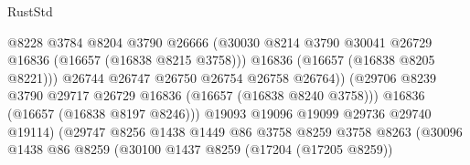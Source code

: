 \begin{lexlean}{RustStd}
\begin{coremodule}
                                              @8228
                                              @3784
                                              @8204
                                              @3790
                                              @26666
                                              (@30030
                                                @8214
                                                @3790
                                                @30041
                                                @26729
                                                @16836
                                                (@16657 (@16838 @8215 @3758)))
                                              @16836
                                              (@16657 (@16838 @8205 @8221)))
                                            @26744
                                            @26747
                                            @26750
                                            @26754
                                            @26758
                                            @26764))
                                        (@29706
                                          @8239
                                          @3790
                                          @29717
                                          @26729
                                          @16836
                                          (@16657 (@16838 @8240 @3758)))
                                        @16836
                                        (@16657 (@16838 @8197 @8246)))
                                      @19093
                                      @19096
                                      @19099
                                      @29736
                                      @29740
                                      @19114)
                                    (@29747
                                      @8256
                                      @1438
                                      @1449
                                      @86
                                      @3758
                                      @8259
                                      @3758
                                      @8263
                                      (@30096
                                        @1438
                                        @86
                                        @8259
                                        (@30100
                                          @1437
                                          @8259
                                          (@17204 (@17205 @8259))

\end{coremodule}
\end{lexlean}

